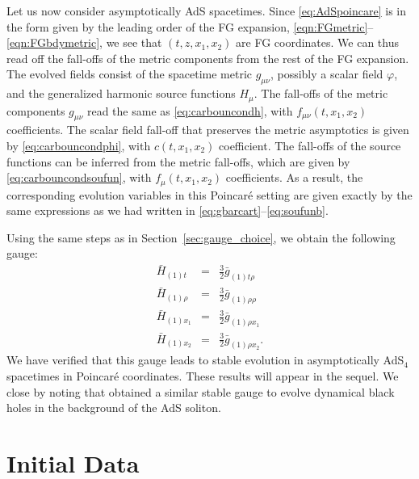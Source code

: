 \documentclass[a4paper,11pt]{article}
\numberwithin{equation}{section}
\begin{document}
Let us now consider asymptotically AdS spacetimes.
Since \eqref{eq:AdSpoincare} is in the form given by the leading order of the FG expansion, \eqref{eqn:FGmetric}--\eqref{eqn:FGbdymetric}, we see that $(t,z,x_1,x_2)$ are FG coordinates.
We can thus read off the fall-offs of the metric components from the rest of the FG expansion.
The evolved fields consist of the spacetime metric $g_{\mu\nu}$, possibly a scalar field $\varphi$, and  the generalized harmonic source functions $H_\mu$.
The fall-offs of the metric components $g_{\mu\nu}$ read the same as \eqref{eq:carbouncondh}, with $f_{\mu\nu}(t,x_1,x_2)$ coefficients.
The scalar field fall-off that preserves the metric asymptotics is given by \eqref{eq:carbouncondphi}, with $c(t,x_1,x_2)$ coefficient.
The fall-offs of the source functions can be inferred from the metric fall-offs, which are given by \eqref{eq:carbouncondsoufun}, with $f_{\mu}(t,x_1,x_2)$ coefficients.
As a result, the corresponding evolution variables in this Poincar\'e setting are given exactly by the same expressions as we had written in \eqref{eq:gbarcart}--\eqref{eq:soufunb}.

Using the same steps as in Section~\ref{sec:gauge_choice}, we obtain the following gauge:
\begin{eqnarray}
\label{eq:hbold_poincare}
\bar{H}_{(1)t}&=&\frac{3}{2} \bar{g}_{(1)\text{$t$$\rho $}} \nonumber\\
\bar{H}_{(1)\rho}&=&\frac{3}{2} \bar{g}_{(1) \rho \rho }\nonumber\\
\bar{H}_{(1)x_1}&=&\frac{3}{2} \bar{g}_{(1) \rho x_1 }\nonumber\\
\bar{H}_{(1)x_2}&=&\frac{3}{2} \bar{g}_{(1) \rho x_2 }.
\end{eqnarray}
We have verified that this gauge leads to stable evolution in asymptotically AdS$_4$ spacetimes in Poincar\'e coordinates.  These results will appear in the sequel. 
We close by noting that \cite{Bantilan:2020pay} obtained a similar stable gauge to evolve dynamical black holes in the background of the AdS soliton. 


\section{Initial Data}
\label{sec:initdata}
\end{document}

